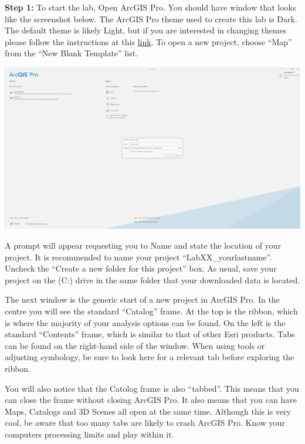 \documentclass[
]{book}
\begin{document}
\textbf{Step 1:} To start the lab, Open ArcGIS Pro. You should have window that looks like the screenshot below. The ArcGIS Pro theme used to create this lab is Dark. The default theme is likely Light, but if you are interested in changing themes please follow the instructions at this \href{https://pro.arcgis.com/en/pro-app/latest/get-started/general-options.htm}{link}. To open a new project, choose ``Map'' from the ``New Blank Template'' list.

\begin{center}\includegraphics[width=1\linewidth]{images/01-starting-arcgispro-prompt} \end{center}

A prompt will appear requesting you to Name and state the location of your project. It is recommended to name your project ``LabXX\_yourlastname''. Uncheck the ``Create a new folder for this project'' box. As usual, save your project on the (C:) drive in the same folder that your downloaded data is located.

The next window is the generic start of a new project in ArcGIS Pro. In the centre you will see the standard ``Catalog'' frame. At the top is the ribbon, which is where the majority of your analysis options can be found. On the left is the standard ``Contents'' frame, which is similar to that of other Esri products. Tabs can be found on the right-hand side of the window. When using tools or adjusting symbology, be sure to look here for a relevant tab before exploring the ribbon.

You will also notice that the Catolog frame is also ``tabbed''. This means that you can close the frame without closing ArcGIS Pro. It also means that you can have Maps, Catalogs and 3D Scenes all open at the same time. Although this is very cool, be aware that too many tabs are likely to crash ArcGIS Pro. Know your computers processing limits and play within it.
\end{document}
